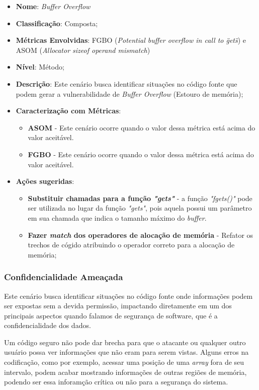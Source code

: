 \begin{itemize}
\item \textbf{Nome}: \emph{Buffer Overflow}
\item \textbf{Classificação}: Composta;
\item \textbf{Métricas Envolvidas}: FGBO (\emph{Potential buffer overflow in call to \"gets\"}) e ASOM (\emph{Allocator sizeof operand mismatch})
\item \textbf{Nível}: Método;
\item \textbf{Descrição}: Este cenário busca identificar situações no código fonte que podem gerar a vulnerabilidade de \emph{Buffer Overflow} (Estouro de memória);
\item \textbf{Caracterização com Métricas}: 
	\begin{itemize}
	\item \textbf{ASOM} - Este cenário ocorre quando o valor dessa métrica está acima do valor aceitável.
	\item \textbf{FGBO} - Este cenário ocorre quando o valor dessa métrica está acima do valor aceitável.
	\end{itemize}
\item \textbf{Ações sugeridas}: 
	\begin{itemize}
	\item \textbf{Substituir chamadas para a função \emph{"gets"}} - a função \emph{"fgets()"} pode ser utilizada no lugar da função  \emph{"gets"}, pois aquela possui um parâmetro em sua chamada que indica o tamanho máximo do \emph{buffer}.  
	\item \textbf{Fazer \emph{match} dos operadores de alocação de memória} - Refator os trechos de cógido atribuindo o operador correto para a alocação de memória; 
	\end{itemize}
\end{itemize}

\subsubsection{Confidencialidade Ameaçada}

Este cenário busca identificar situações no código fonte onde informações podem ser expostas sem a devida permissão, impactando diretamente em um dos principais aspectos quando falamos de segurança de software, que é a confidencialidade dos dados.

Um código seguro não pode dar brecha para que o atacante ou qualquer outro usuário possa ver informações que não eram para serem vistas. Alguns erros na codificação, como por exemplo, acessar uma posição de uma \emph{array} fora de seu intervalo, podem acabar mostrando informações de outras regiões de memória, podendo ser essa inforamção crítica ou não para a segurança do sistema.

